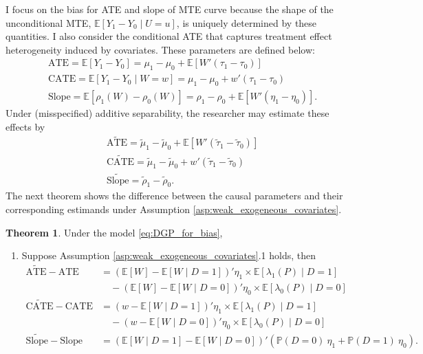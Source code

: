 \documentclass[11pt]{article}
\theoremstyle{definition}
\newtheorem{theorem}{Theorem}[section]
\newcommand{\Exp}{\ensuremath{\mathbb{E}}} %
\newcommand{\Prob}{\ensuremath{\mathbb{P}}} %
\newcommand{\0}{\ensuremath{\mathbf{0}}}
\begin{document}
\begin{bibunit}
I focus on the bias for ATE and slope of MTE curve because the shape of the unconditional MTE, $\Exp[Y_1-Y_0\mid U=u]$, is uniquely determined by these quantities. I also consider the conditional ATE that captures  treatment effect heterogeneity induced by covariates. These parameters are defined below:
%
%
%
%
\begin{align*}
    & \text{ATE} = \Exp[Y_1 - Y_0] = \mu_1 - \mu_0 + \Exp[W'(\tau_1 - \tau_0)] \\
    & \text{CATE} = \Exp[Y_1 - Y_0\mid W=w] = \mu_1 - \mu_0 + w'(\tau_1 - \tau_0) \\
    & \text{Slope} = \Exp[\rho_1(W) - \rho_0(W)] = \rho_1 - \rho_0 + \Exp[W'(\eta_1 - \eta_0)].
\end{align*}
Under (misspecified) additive separability, the researcher may estimate these effects by 
\begin{align*}
    & \widetilde{\text{ATE}} = \tilde{\mu}_1 - \tilde{\mu}_0 + \Exp[W'(\tilde{\tau}_1 - \tilde{\tau}_0)] \\
    & \widetilde{\text{CATE}} = \tilde{\mu}_1 - \tilde{\mu}_0 + w'(\tilde{\tau}_1 - \tilde{\tau}_0) \\
    & \widetilde{\text{Slope}} = \tilde{\rho}_1 - \tilde{\rho}_0.
\end{align*}
The next theorem shows the difference between the causal parameters and their corresponding estimands under Assumption \ref{asp:weak_exogeneous_covariates}.
\clearpage
\begin{theorem}
Under the model \eqref{eq:DGP_for_bias}, 
    \label{thm:bias_formula_specific}
    \begin{enumerate}
        \item Suppose Assumption \ref{asp:weak_exogeneous_covariates}.1 holds, then 
        \begin{align*}
            \widetilde{\text{ATE}} - \text{ATE} 
            &= (\Exp[W] - \Exp[W\mid D=1])'\eta_1\times \Exp[\lambda_1(P)\mid D=1] \\
                &\quad - (\Exp[W] - \Exp[W\mid D=0])'\eta_0 \times \Exp[\lambda_0(P)\mid D=0] \\
            \widetilde{\text{CATE}} - \text{CATE}
            &= (w - \Exp[W\mid D=1])'\eta_1\times \Exp[\lambda_1(P)\mid D=1] \\
                &\quad - (w - \Exp[W\mid D=0])'\eta_0 \times \Exp[\lambda_0(P)\mid D=0]  \\
            \widetilde{\text{Slope}} - \text{Slope}
            &= \left(\Exp[W\mid D=1] - \Exp[W\mid D=0]\right)'(\Prob(D=0) ~ \eta_1 + \Prob(D=1) ~ \eta_0).

\end{align*}
\end{enumerate}
\end{theorem}
\end{bibunit}
\end{document}
